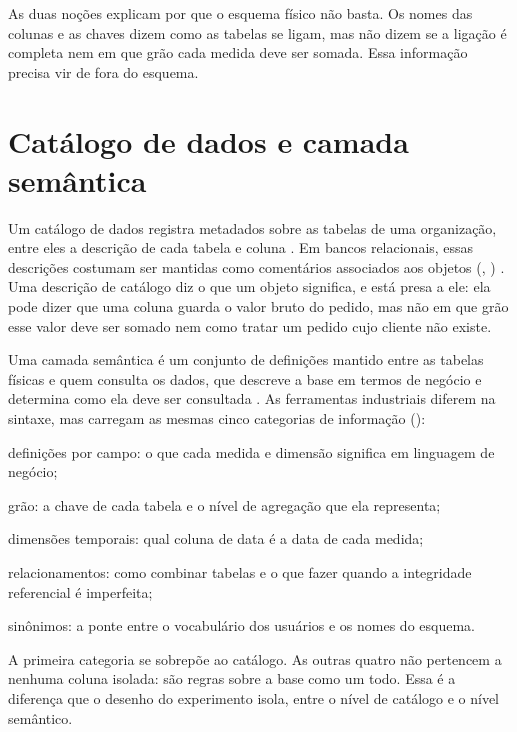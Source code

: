 As duas noções explicam por que o esquema físico não basta. Os nomes das
colunas e as chaves dizem como as tabelas se ligam, mas não dizem se a
ligação é completa nem em que grão cada medida deve ser somada. Essa
informação precisa vir de fora do esquema.

\section{Catálogo de dados e camada semântica}
\label{sec:camada-semantica}

Um catálogo de dados registra metadados sobre as tabelas de uma
organização, entre eles a descrição de cada tabela e coluna
\cite{ehrlinger2021catalogs,dama2017dmbok}. Em bancos relacionais, essas
descrições costumam ser mantidas como comentários associados aos objetos
(, )
\cite{postgres_comment,databricks_comment}. Uma descrição de catálogo diz
o que um objeto significa, e está presa a ele: ela pode dizer que uma
coluna guarda o valor bruto do pedido, mas não em que grão esse valor deve
ser somado nem como tratar um pedido cujo cliente não existe.

Uma camada semântica é um conjunto de definições mantido entre as tabelas
físicas e quem consulta os dados, que descreve a base em termos de negócio
e determina como ela deve ser consultada \cite{jones2024semanticlayer}. As
ferramentas industriais diferem na sintaxe, mas carregam as mesmas cinco
categorias de informação ():
\begin{alineas}
  \item definições por campo: o que cada medida e dimensão significa em
        linguagem de negócio;
  \item grão: a chave de cada tabela e o nível de agregação que ela
        representa;
  \item dimensões temporais: qual coluna de data é a data de cada medida;
  \item relacionamentos: como combinar tabelas e o que fazer quando a
        integridade referencial é imperfeita;
  \item sinônimos: a ponte entre o vocabulário dos usuários e os nomes do
        esquema.
\end{alineas}

A primeira categoria se sobrepõe ao catálogo. As outras quatro não
pertencem a nenhuma coluna isolada: são regras sobre a base como um todo.
Essa é a diferença que o desenho do experimento isola, entre o nível de
catálogo e o nível semântico.

